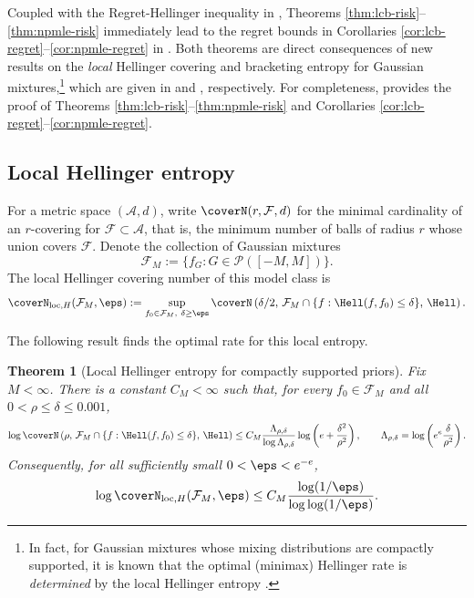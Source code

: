 \documentclass[letterpaper,11pt]{article}
\newcommand{\calA}{{\mathcal{A}}}
\newcommand{\calF}{{\mathcal{F}}}
\newtheorem{theorem}{Theorem}
\theoremstyle{definition}
\begin{document}
Coupled with the Regret-Hellinger inequality in , 
Theorems \ref{thm:lcb-risk}--\ref{thm:npmle-risk} immediately lead to the regret bounds in
Corollaries \ref{cor:lcb-regret}--\ref{cor:npmle-regret} in .
Both theorems are direct consequences of new results on the \emph{local} Hellinger covering and bracketing entropy for Gaussian mixtures,\footnote{In fact, for Gaussian mixtures whose mixing distributions are  compactly supported, it is known that the optimal (minimax) Hellinger
rate is \textit{determined} by the local Hellinger entropy \cite{jia.polyanskiy.wu.2023}.} which are given in  and , respectively. For completeness,  provides the proof of Theorems \ref{thm:lcb-risk}--\ref{thm:npmle-risk} and Corollaries \ref{cor:lcb-regret}--\ref{cor:npmle-regret}.






\subsection{Local Hellinger entropy}
\label{sec:local-covering-number}
For a metric
space $(\mathcal A,d)$, write $\coverN(r,\mathcal F,d)$ for the minimal cardinality of an
$r$-covering for $\calF\subset\calA$, that is, the minimum number of balls of radius $r$ whose union covers $\calF$. 
Denote the collection of Gaussian mixtures
\[
\calF_M:=\{f_G:G\in\mathcal P([-M,M])\}.
\]
 The local Hellinger covering number of this model class is
\[
\coverN_{\mathrm{loc},H}(\calF_M,\eps)
:=
\sup_{f_0\in\calF_M,\ \delta\ge\eps}
\coverN\left(
\delta/2,\,
\calF_M\cap\{f:\Hell(f,f_0)\le\delta\},\,
\Hell
\right).
\]



The following result finds the optimal rate for this local entropy. 

\begin{theorem}[Local Hellinger entropy for compactly supported priors]
\label{thm:localcovering}
Fix $M<\infty$.  There is a constant $C_M<\infty$ such that, for every
$f_0\in\calF_M$ and all $0<\rho\le\delta\le 0.001$,
\[
\log
\coverN\left(
\rho,\,
\calF_M\cap\{f:\Hell(f,f_0)\le\delta\},\,
\Hell
\right)
\le
C_M
\frac{\Lambda_{\rho,\delta}}{\log\Lambda_{\rho,\delta}}
\log\left(e+\frac{\delta^2}{\rho^2}\right),
\qquad
\Lambda_{\rho,\delta}
=
\log\left(e^e\frac{\delta}{\rho^2}\right).
\]
Consequently, for all sufficiently small $0<\eps<e^{-e}$,
\begin{equation}
\log \coverN_{\mathrm{loc},H}(\calF_M,\eps)
\le
C_M\frac{\log(1/\eps)}{\log\log(1/\eps)}.
\label{eq:localcovering}
\end{equation}
\end{theorem}
\end{document}
